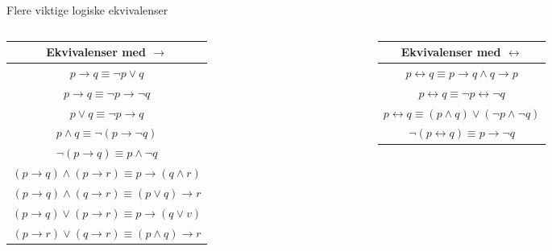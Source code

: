 \begin{frame}{Flere viktige logiske ekvivalenser}
    \begin{columns}
    \begin{column}{0.48\textwidth}
        \begin{tabular}{c}
            Ekvivalenser med $\rightarrow$ \\ \hline
            $p \rightarrow q \equiv \lnot p \lor q$ \\
            $p \rightarrow q \equiv \lnot p \rightarrow \lnot q$ \\
            $p \lor q \equiv \lnot p \rightarrow q$ \\
            $p \land q \equiv \lnot (p \rightarrow \lnot q)$ \\
            $\lnot (p \rightarrow q) \equiv p \land \lnot q$ \\
            $(p \rightarrow q) \land (p \rightarrow r) \equiv p \rightarrow (q \land r)$ \\
            $(p \rightarrow q) \land (q \rightarrow r) \equiv (p \lor q) \rightarrow r$ \\
            $(p \rightarrow q) \lor (p \rightarrow r) \equiv p \rightarrow (q \lor v)$ \\
            $(p \rightarrow r) \lor (q \rightarrow r) \equiv (p \land q) \rightarrow r$
        \end{tabular}
    \end{column}
    \begin{column}{0.48\textwidth}
        \begin{tabular}{c}
            Ekvivalenser med $\leftrightarrow$ \\ \hline
            $p \leftrightarrow q \equiv p \rightarrow q \land q \rightarrow p$ \\
            $p \leftrightarrow q \equiv \lnot p \leftrightarrow \lnot q$ \\
            $p \leftrightarrow q \equiv (p \land q) \lor (\lnot p \land \lnot q)$\\
            $\lnot (p \leftrightarrow q) \equiv p \rightarrow \lnot q$
        \end{tabular}
    \end{column}
    \end{columns}
\end{frame}

